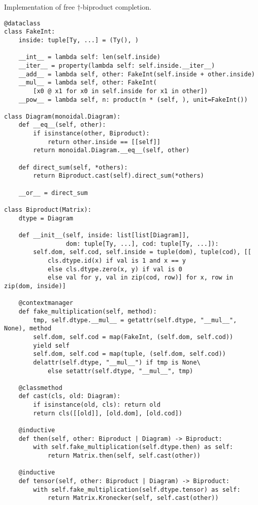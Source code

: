 \begin{python}
{\normalfont Implementation of free $\dagger$-biproduct completion.}

\begin{verbatim}
@dataclass
class FakeInt:
    inside: tuple[Ty, ...] = (Ty(), )

    __int__ = lambda self: len(self.inside)
    __iter__ = property(lambda self: self.inside.__iter__)
    __add__ = lambda self, other: FakeInt(self.inside + other.inside)
    __mul__ = lambda self, other: FakeInt(
        [x0 @ x1 for x0 in self.inside for x1 in other])
    __pow__ = lambda self, n: product(n * (self, ), unit=FakeInt())

class Diagram(monoidal.Diagram):
    def __eq__(self, other):
        if isinstance(other, Biproduct):
            return other.inside == [[self]]
        return monoidal.Diagram.__eq__(self, other)

    def direct_sum(self, *others):
        return Biproduct.cast(self).direct_sum(*others)

    __or__ = direct_sum

class Biproduct(Matrix):
    dtype = Diagram

    def __init__(self, inside: list[list[Diagram]],
                 dom: tuple[Ty, ...], cod: tuple[Ty, ...]):
        self.dom, self.cod, self.inside = tuple(dom), tuple(cod), [[
            cls.dtype.id(x) if val is 1 and x == y
            else cls.dtype.zero(x, y) if val is 0
            else val for y, val in zip(cod, row)] for x, row in zip(dom, inside)]

    @contextmanager
    def fake_multiplication(self, method):
        tmp, self.dtype.__mul__ = getattr(self.dtype, "__mul__", None), method
        self.dom, self.cod = map(FakeInt, (self.dom, self.cod))
        yield self
        self.dom, self.cod = map(tuple, (self.dom, self.cod))
        delattr(self.dtype, "__mul__") if tmp is None\
            else setattr(self.dtype, "__mul__", tmp)

    @classmethod
    def cast(cls, old: Diagram):
        if isinstance(old, cls): return old
        return cls([[old]], [old.dom], [old.cod])

    @inductive
    def then(self, other: Biproduct | Diagram) -> Biproduct:
        with self.fake_multiplication(self.dtype.then) as self:
            return Matrix.then(self, self.cast(other))

    @inductive
    def tensor(self, other: Biproduct | Diagram) -> Biproduct:
        with self.fake_multiplication(self.dtype.tensor) as self:
            return Matrix.Kronecker(self, self.cast(other))


\end{verbatim}
\end{python}
